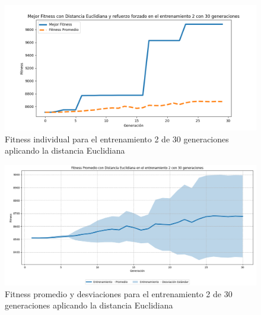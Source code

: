 \documentclass[conference]{IEEEtran}
\begin{document}
\begin{figure}[H]
    \centering
    \includegraphics[width=0.9 \linewidth]{Euclidiana/Fitness_individual_30/Fitness_2_Eucli_30Gen.png}
    \caption{Fitness individual para el entrenamiento 2 de 30 generaciones aplicando la distancia Euclidiana}
    \label{fig:eucli_2_30}
\end{figure}
\begin{figure}[H]
    \centering
    \includegraphics[width=0.9 \linewidth]{Euclidiana/Fitness_individual_30/Fitness_2_Eucli_30Gen_Sombra.png}
    \caption{Fitness promedio y desviaciones para el entrenamiento 2 de 30 generaciones aplicando la distancia Euclidiana}
    \label{fig:eucli_2_30_sombra}
\end{figure}
\end{document}
